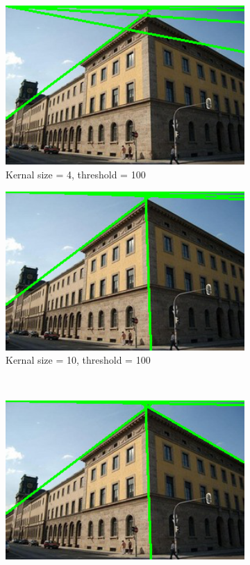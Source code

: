 \documentclass[12pt
,headinclude
,headsepline
,bibtotocnumbered
]{scrartcl}
\begin{document}
\begin{figure}[H]
    \centering
    \begin{subfigure}{0.45\textwidth}
        \includegraphics[width=1\textwidth]{plots/houghlines_4_100.png}
        \caption*{Kernal size = 4, threshold = 100}
    \end{subfigure}
    \hfill
    \begin{subfigure}{0.45\textwidth}
        \includegraphics[width=1\textwidth]{plots/houghlines_10_100.png}
        \caption*{Kernal size = 10, threshold = 100}
    \end{subfigure}
    \\
    \begin{subfigure}{0.45\textwidth}
        \includegraphics[width=1\textwidth]{plots/houghlines_20_80.png}

\end{subfigure}
\end{figure}
\end{document}
